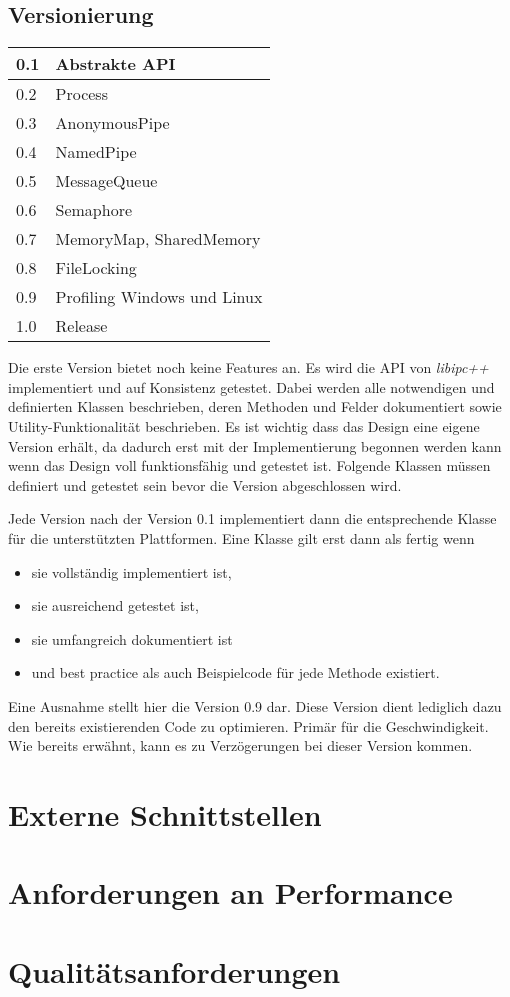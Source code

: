 \documentclass[a4paper]{book}
\begin{document}
\subsection{Versionierung}
\begin{center}
\begin{longtable}{|p{3cm}|p{8cm}|}
\hline
0.1 & Abstrakte API \\
\hline
0.2 & Process \\
\hline
0.3 & AnonymousPipe \\
\hline
0.4 & NamedPipe \\
\hline 
0.5 & MessageQueue \\
\hline
0.6 & Semaphore \\
\hline
0.7 & MemoryMap, SharedMemory \\ 
\hline
0.8 & FileLocking \\
\hline
0.9 & Profiling Windows und Linux\\
\hline
1.0 & Release \\
\hline
\end{longtable}
\end{center}
Die erste Version bietet noch keine Features an. Es wird die API von \textit{libipc++} implementiert und auf Konsistenz getestet. Dabei werden alle notwendigen und definierten Klassen beschrieben, deren Methoden und Felder dokumentiert sowie Utility-Funktionalität beschrieben. Es ist wichtig dass das Design eine eigene Version erhält, da dadurch erst mit der Implementierung begonnen werden kann wenn das Design voll funktionsfähig und getestet ist. Folgende Klassen müssen definiert und getestet sein bevor die Version abgeschlossen wird.\newline

\noindent Jede Version nach der Version 0.1 implementiert dann die entsprechende Klasse für die unterstützten Plattformen. Eine Klasse gilt erst dann als fertig wenn
\begin{itemize}
\item sie vollständig implementiert ist,
\item sie ausreichend getestet ist,
\item sie umfangreich dokumentiert ist
\item und best practice als auch Beispielcode für jede Methode existiert.
\end{itemize}

\noindent Eine Ausnahme stellt hier die Version 0.9 dar. Diese Version dient lediglich dazu den bereits existierenden Code zu optimieren. Primär für die Geschwindigkeit. Wie bereits erwähnt, kann es zu Verzögerungen bei dieser Version kommen.

\section{Externe Schnittstellen}
\blindtext

\section{Anforderungen an Performance}
\blindtext

\section{Qualitätsanforderungen}
\blindtext
\end{document}
